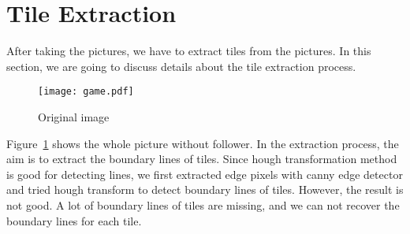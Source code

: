 \section{Tile Extraction}
After taking the pictures, we have to extract tiles from the pictures.
In this section, we are going to discuss details about the tile 
extraction process.


\begin{figure}[htbp]
	  \centering
	  \texttt{[image: game.pdf]}
	  \caption{Original image}
	  \label{Original_im}
\end{figure}

Figure~\ref{Original_im} shows the whole picture without follower. 
In the extraction process, the aim is to extract the boundary lines of 
tiles. Since hough transformation method is good for detecting lines, we
first extracted edge pixels with canny edge detector and tried hough 
transform to detect boundary lines of tiles. However, the result is not 
good. A lot of boundary lines of tiles are missing, and we can not recover 
the boundary lines for each tile.

